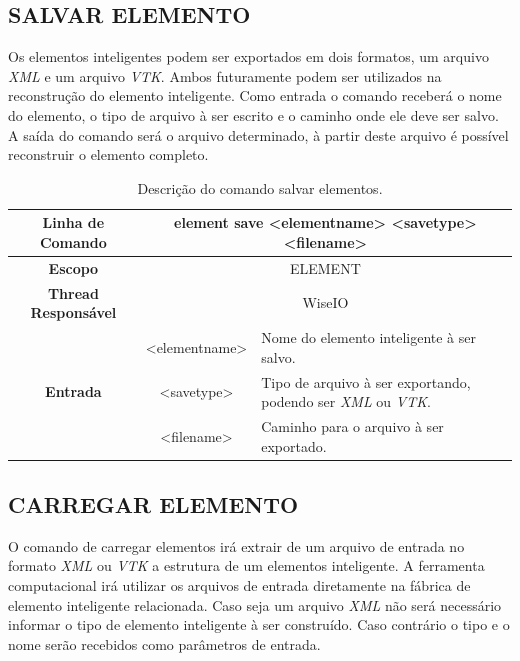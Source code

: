 \subsection{SALVAR ELEMENTO}\label{sec:save_element}

Os elementos inteligentes podem ser exportados em dois formatos, um arquivo \textit{XML} e um arquivo \textit{VTK}. Ambos futuramente podem ser utilizados na reconstrução do elemento inteligente. Como entrada o comando receberá o nome do elemento, o tipo de arquivo à ser escrito e o caminho onde ele deve ser salvo. A saída do comando será o arquivo determinado, à partir deste arquivo é possível reconstruir o elemento completo.

\begin{center}
	\begin{table}[!htbp]
		\begin{tabularx}{\textwidth}{c|c|X}
			\toprule
			\textbf{Linha de Comando} & \multicolumn{2}{c}{element save <element\underline{\space\space}name> <save\underline{\space\space}type> <filename>} \\
			\midrule
			\textbf{Escopo} & \multicolumn{2}{c}{ELEMENT} \\
			\hline
			\textbf{Thread Responsável} & \multicolumn{2}{c}{WiseIO} \\
			\hline
			\multirow{3}{*}{\textbf{Entrada}} & <element\underline{\space\space}name> & Nome do elemento inteligente à ser salvo. \\
			& <save\underline{\space\space}type> & Tipo de arquivo à ser exportando, podendo ser \textit{XML} ou \textit{VTK}. \\
			& <filename> & Caminho para o arquivo à ser exportado. \\
			\bottomrule
		\end{tabularx}
		\caption{Descrição do comando salvar elementos.}
		\label{tab:save_element}
	\end{table}
\end{center}

\subsection{CARREGAR ELEMENTO}\label{sec:load_element}

O comando de carregar elementos irá extrair de um arquivo de entrada no formato \textit{XML} ou \textit{VTK} a estrutura de um elementos inteligente. A ferramenta computacional irá utilizar os arquivos de entrada diretamente na fábrica de elemento inteligente relacionada. Caso seja um arquivo \textit{XML} não será necessário informar o tipo de elemento inteligente à ser construído. Caso contrário o tipo e o nome serão recebidos como parâmetros de entrada.

